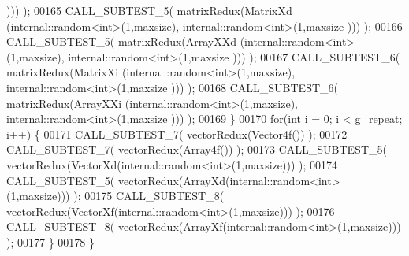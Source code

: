 \begin{DoxyCode}
      ))) );
00165     CALL\_SUBTEST\_5( matrixRedux(MatrixXd (internal::random<int>(1,maxsize), internal::random<int>(1,maxsize
      ))) );
00166     CALL\_SUBTEST\_5( matrixRedux(ArrayXXd (internal::random<int>(1,maxsize), internal::random<int>(1,maxsize
      ))) );
00167     CALL\_SUBTEST\_6( matrixRedux(MatrixXi (internal::random<int>(1,maxsize), internal::random<int>(1,maxsize
      ))) );
00168     CALL\_SUBTEST\_6( matrixRedux(ArrayXXi (internal::random<int>(1,maxsize), internal::random<int>(1,maxsize
      ))) );
00169   \}
00170   \textcolor{keywordflow}{for}(\textcolor{keywordtype}{int} i = 0; i < g\_repeat; i++) \{
00171     CALL\_SUBTEST\_7( vectorRedux(Vector4f()) );
00172     CALL\_SUBTEST\_7( vectorRedux(Array4f()) );
00173     CALL\_SUBTEST\_5( vectorRedux(VectorXd(internal::random<int>(1,maxsize))) );
00174     CALL\_SUBTEST\_5( vectorRedux(ArrayXd(internal::random<int>(1,maxsize))) );
00175     CALL\_SUBTEST\_8( vectorRedux(VectorXf(internal::random<int>(1,maxsize))) );
00176     CALL\_SUBTEST\_8( vectorRedux(ArrayXf(internal::random<int>(1,maxsize))) );
00177   \}
00178 \}
\end{DoxyCode}
